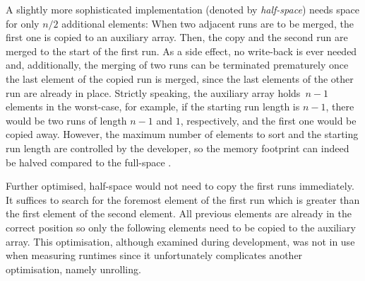 A slightly more sophisticated implementation (denoted by \emph{half-space}) needs space for only \(n/2\) additional elements:
When two adjacent runs are to be merged, the first one is copied to an auxiliary array.
Then, the copy and the second run are merged to the start of the first run.
As a side effect, no write-back is ever needed and, additionally, the merging of two runs can be terminated prematurely once the last element of the copied run is merged, since the last elements of the other run are already in place.
Strictly speaking, the auxiliary array holds~\(n-1\) elements in the worst-case, for example, if the starting run length is \(n-1\), there would be two runs of length \(n - 1\) and \(1\), respectively, and the first one would be copied away.
However, the maximum number of elements to sort and the starting run length are controlled by the developer, so the memory footprint can indeed be halved compared to the full-space \MS{}.

Further optimised, half-space \MS{} would not need to copy the first runs immediately.
It suffices to search for the foremost element of the first run which is greater than the first element of the second element.
All previous elements are already in the correct position so only the following elements need to be copied to the auxiliary array.
This optimisation, although examined during development, was not in use when measuring runtimes since it unfortunately complicates another optimisation, namely unrolling.


